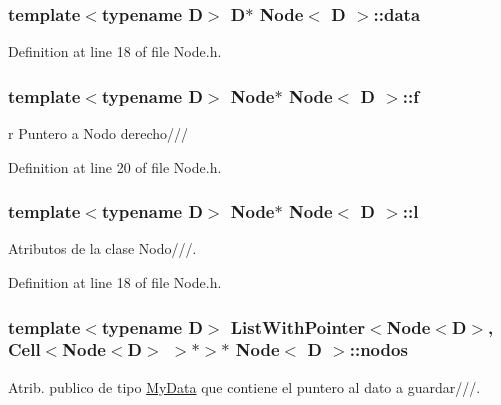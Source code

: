 \hypertarget{class_node_a94c115991edeecf6664eaa4884fbf6ca}{
\subsubsection[{data}]{\setlength{\rightskip}{0pt plus 5cm}template$<$typename D$>$ {\bf D}$\ast$ {\bf Node}$<$ {\bf D} $>$\+::data}}\label{class_node_a94c115991edeecf6664eaa4884fbf6ca}


Definition at line 18 of file Node.\+h.

\hypertarget{class_node_a33f853af2475252e43c437811478fae1}{
\subsubsection[{f}]{\setlength{\rightskip}{0pt plus 5cm}template$<$typename D$>$ {\bf Node}$\ast$ {\bf Node}$<$ {\bf D} $>$\+::f}}\label{class_node_a33f853af2475252e43c437811478fae1}


r Puntero a Nodo derecho/// 



Definition at line 20 of file Node.\+h.

\hypertarget{class_node_a0887ae573dd58274be628313b5170186}{
\subsubsection[{l}]{\setlength{\rightskip}{0pt plus 5cm}template$<$typename D$>$ {\bf Node}$\ast$ {\bf Node}$<$ {\bf D} $>$\+::l}}\label{class_node_a0887ae573dd58274be628313b5170186}


Atributos de la clase Nodo///. 



Definition at line 18 of file Node.\+h.

\hypertarget{class_node_a7c58a21705e05644b17d7a46f8c11d18}{
\subsubsection[{nodos}]{\setlength{\rightskip}{0pt plus 5cm}template$<$typename D$>$ {\bf List\+With\+Pointer}$<${\bf Node}$<${\bf D}$>$, {\bf Cell}$<${\bf Node}$<${\bf D}$>$ $>$$\ast$$>$$\ast$ {\bf Node}$<$ {\bf D} $>$\+::nodos}}\label{class_node_a7c58a21705e05644b17d7a46f8c11d18}


Atrib. publico de tipo \hyperlink{class_my_data}{My\+Data} que contiene el puntero al dato a guardar///. 




